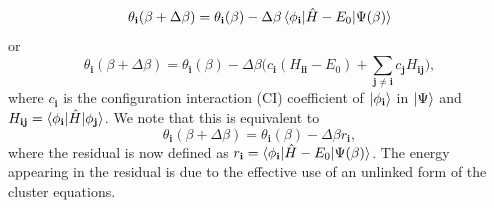 \documentclass[%
 reprint,
 amsmath,amssymb,
 aps,
]{revtex4-2}
\begin{document}
\begin{equation}
    \theta_\mathbf{i}(\beta + \Delta \beta) = \theta_\mathbf{i}(\beta) - \Delta\beta\braket{\phi_\mathbf{i}|\hat H-E_0|\Psi(\beta)}
\end{equation}
or
\begin{equation}
  \theta_\mathbf{i}(\beta + \Delta \beta) = \theta_\mathbf{i}(\beta) - \Delta\beta\Big(c_\mathbf{i} (H_\mathbf{ii} - E_0) + \sum_{\mathbf{j} \neq \mathbf{i}} c_\mathbf{j}H_\mathbf{ij}\Big),  
  \label{eq:pop_dyn}
\end{equation}
where $c_\mathbf{i}$ is the configuration interaction (CI) coefficient of $\ket{\phi_\mathbf{i}}$ in $\ket{\Psi}$ and $H_\mathbf{ij} = \braket{\phi_\mathbf{i}|\hat H|\phi_\mathbf{j}}$. We note that this is equivalent to 
\begin{equation}
\theta_\mathbf{i}(\beta + \Delta \beta) = \theta_\mathbf{i}(\beta) - \Delta\beta r_\mathbf{i},
\label{eq:param_resid}
\end{equation}
where the residual is now defined as $r_\mathbf{i} = \braket{\phi_\mathbf{i}|\hat H-E_0|\Psi(\beta)}$. The energy appearing in the residual is due to the effective use of an unlinked form of the cluster equations.
\end{document}
